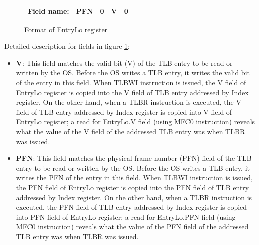 \documentclass[oneside]{book}
\begin{document}
\begin{itemize}
\begin{figure}[H]
\begin{center}
\begin{tabular}{|c|c|c|c|c|}
\hline \textbf{Field name:}   & PFN    & 0      & V & 0    \\

\hline

\end{tabular}

\end{center}
\caption{Format of EntryLo register}
\label{entrylo_reg}
\end{figure}

Detailed description for fields in figure \ref{entrylo_reg}:

\begin{itemize}

\item \textbf{V}: This field matches the valid bit (V) of the
                  TLB entry to be read or written by the OS.
                  Before the OS writes a TLB entry, it writes
                  the valid bit of the entry in this field. When
                  TLBWI instruction is issued, the V field of
                  EntryLo register is copied into the V field
                  of TLB entry addressed by Index register. On
                  the other hand, when a TLBR instruction is
                  executed, the V field of TLB entry addressed
                  by Index register is copied into V field of
                  EntryLo register; a read for EntryLo.V field
                  (using MFC0 instruction) reveals what
                  the value of the V field of the addressed
                  TLB entry was when TLBR was issued.

\item \textbf{PFN}: This field matches the physical frame number
                    (PFN) field of the
                    TLB entry to be read or written by the OS.
                    Before the OS writes a TLB entry, it writes
                    the PFN of the entry in this field. When
                    TLBWI instruction is issued, the PFN field of
                    EntryLo register is copied into the PFN field
                    of TLB entry addressed by Index register. On
                    the other hand, when a TLBR instruction is
                    executed, the PFN field of TLB entry addressed
                    by Index register is copied into PFN field of
                    EntryLo register; a read for EntryLo.PFN field
                    (using MFC0 instruction) reveals what
                    the value of the PFN field of the addressed
                    TLB entry was when TLBR was issued.


\end{itemize}
\end{itemize}
\end{document}
